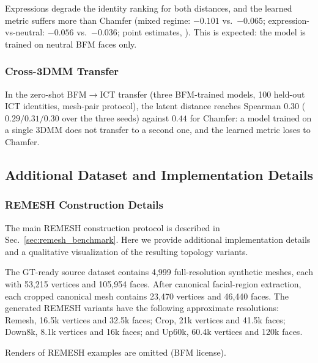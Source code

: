 Expressions degrade the identity ranking for both distances, and the learned metric suffers more than Chamfer (mixed regime: $-0.101$ vs.\ $-0.065$; expression-vs-neutral: $-0.056$ vs.\ $-0.036$; point estimates, ). This is expected: the model is trained on neutral BFM faces only. 

\subsubsection{Cross-3DMM Transfer}
\label{sec:cross3dmm}
In the zero-shot BFM$\rightarrow$ICT transfer (three BFM-trained models, 100 held-out ICT identities, mesh-pair protocol), the latent distance reaches Spearman $0.30$ ($0.29/0.31/0.30$ over the three seeds) against $0.44$ for Chamfer: a model trained on a single 3DMM does not transfer to a second one, and the learned metric loses to Chamfer. 

\subsection{Additional Dataset and Implementation Details}
\label{app:implementation_details}

\subsubsection{REMESH Construction Details}
\label{app:remesh_details}

The main REMESH construction protocol is described in
Sec.~\ref{sec:remesh_benchmark}. Here we provide additional implementation
details and a qualitative visualization of the resulting topology variants.

The GT-ready source dataset contains 4,999 full-resolution synthetic meshes, each
with 53,215 vertices and 105,954 faces. After canonical facial-region extraction,
each cropped canonical mesh contains 23,470 vertices and 46,440 faces. The
generated REMESH variants have the following approximate resolutions: Remesh,
16.5k vertices and 32.5k faces; Crop, 21k vertices and 41.5k faces; Down8k,
8.1k vertices and 16k faces; and Up60k, 60.4k vertices and 120k faces.

Renders of REMESH examples are omitted (BFM license).



